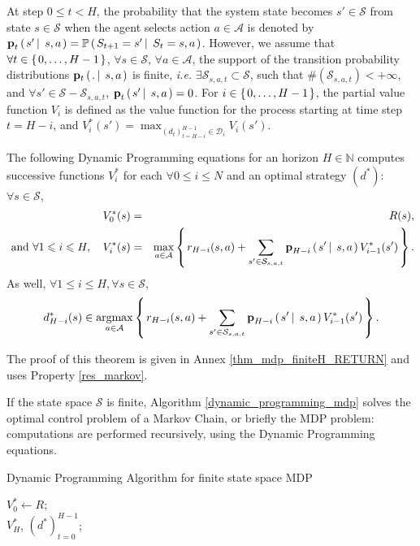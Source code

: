 At step $0 \leqslant t < H$, 
the probability that the system state becomes $s' \in \mathcal{S}$
from state $s \in \mathcal{S}$ when the agent selects action $a \in \mathcal{A}$
is denoted by $\textbf{p}_t \left( \left.  s' \, \right| \left. \, s, a  \right. \right) = \mathbb{P} \left( \left. S_{t+1} = s' \, \right| \left. \, S_t = s, a \right. \right)$.
However, we assume that 
$\forall t \in \left\{ \left. 0, \ldots, H-1 \right. \right\}$,
$\forall s \in \mathcal{S}$, 
$\forall a \in \mathcal{A}$, 
the support of the transition probability distributions 
$\mathbf{p}_t \left( \left.  . \, \right| \left. \, s,a  \right. \right)$ is finite, 
\textit{i.e.} $\exists \mathcal{S}_{s,a,t} \subset \mathcal{S}$, such that
$\# (\mathcal{S}_{s,a,t})< +\infty$, 
and $\forall s' \in \mathcal{S} - \mathcal{S}_{s,a,t}$, 
$\textbf{p}_t \left( \left.  s' \, \right| \left. \, s,a \right. \right)=0$. 
For $i \in \left\{ \left. 0,\ldots,H-1 \right. \right\}$, the partial value function $V_i$
is defined as the value function for the process starting
at time step $t = H-i$, and $\displaystyle V_i^*(s') = \max_{(d_t)_{t=H-i}^{H-1} \in \mathcal{D}_{i}} V_i(s') $.
\begin{theorem}
The following Dynamic Programming equations for an horizon $H \in \mathbb{N}$ 
computes successive functions $V^*_i$ for each $\forall 0 \leqslant i \leqslant N$
and an optimal strategy $(d^*)$: $\forall s \in \mathcal{S}$,
\begin{eqnarray*}
V_0^*(s) & = & R(s),\\
\mbox{ and } \forall 1 \leqslant i \leqslant H, \ \ \ V^*_{i}(s) & = & \max_{a \in \mathcal{A}} \left\{ \left.  r_{H-i}(s,a) 
+ \sum_{s' \in \mathcal{S}_{s,a,t}} \textbf{p}_{H-i} \left( \left.  s' \, \right| \left. \, s,a  \right. \right) V^*_{i-1}(s')  \right. \right\}.
\label{bellman_equation}
\end{eqnarray*}
As well,
$\forall 1 \leqslant i \leqslant H, \forall s \in \mathcal{S},$ 
\begin{eqnarray*}
d^*_{H-i}(s) \in \operatorname*{argmax}_{a \in \mathcal{A}} \left\{ \left.  r_{H-i}(s,a) 
+ \sum_{s' \in \mathcal{S}_{s,a,t}} \textbf{p}_{H-i} \left( \left.  s' \, \right| \left. \, s,a  \right. \right) V^*_{i-1}(s')  \right. \right\}.
\end{eqnarray*}
\label{thm_mdp_finiteH}
\end{theorem}
The proof of this theorem is given in Annex \ref{thm_mdp_finiteH_RETURN} and uses Property \ref{res_markov}.

If the state space $\mathcal{S}$ is finite,
Algorithm \ref{dynamic_programming_mdp} solves
the optimal control problem of a Markov Chain,
or briefly the MDP problem:
computations are performed recursively,
using the Dynamic Programming equations.

\begin{algorithm} \caption{Dynamic Programming Algorithm for finite state space MDP} \label{dynamic_programming_mdp}
$V_0^* \gets R$;\\
\Return $V^*_H$, $(d^*)_{t=0}^{H-1}$;
\end{algorithm}

